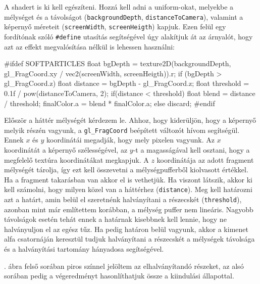 A shadert is ki kell egészíteni. Hozzá kell adni a uniform-okat, melyekbe a mélységet és a távolságot (\texttt{backgroundDepth}, \texttt{distanceToCamera}), valamint a képernyő méreteit (\texttt{screenWidth}, \texttt{screenHeigth}) kapjuk. Ezen felül egy fordítónak szóló \texttt{\#define} utasítás segítségével úgy alakítjuk át az árnyalót, hogy azt az effekt megvalósítása nélkül is lehessen használni:
\begin{cpp}
#ifdef SOFTPARTICLES
float bgDepth = texture2D(backgroundDepth, 
		    gl_FragCoord.xy / vec2(screenWidth, screenHeigth)).r;
if (bgDepth > gl_FragCoord.z){
    float distance = bgDepth - gl_FragCoord.z;
    float threshold = 0.1f / pow(distanceToCamera, 2);
    if(distance < threshold)
    {
        float blend = distance / threshold;
        finalColor.a = blend * finalColor.a;
    }
}
else{
    discard;
}
#endif
\end{cpp}
Először a háttér mélységét kérdezem le. Ahhoz, hogy kiderüljön, hogy a képernyő melyik részén vagyunk, a \texttt{gl\_FragCoord} beépített változót hívom segítségül. Ennek $x$ és $y$ koordinátái megadják, hogy mely pixelen vagyunk. Az $x$ koordinátát a képernyő szélességével, az $y$-t a magasságával kell osztani, hogy a megfelelő textúra koordinátákat megkapjuk. A $z$ koordinátája az adott fragment mélységét tárolja, így ezt kell összevetni a mélységpufferből kiolvasott értékkel. Ha a fragment takarásban van akkor el is vethetjük. Ha viszont látszik, akkor ki kell számolni, hogy milyen közel van a háttérhez (\texttt{distance}). Meg kell határozni azt a határt, amin belül el szeretnénk halványítani a részecskét (\texttt{threshold}), azonban mint már említettem korábban, a mélység puffer nem lineáris. Nagyobb távolságok esetén tehát ennek a határnak kisebbnek kell lennie, hogy ne halványuljon el az egész tűz. Ha pedig határon belül vagyunk, akkor a kimenet alfa csatornáján keresztül tudjuk halványítani a részecskét a mélységek távolsága és a halványítási tartomány hányadosa segítségével.

. ábra felső sorában piros színnel jelöltem az elhalványítandó részeket, az alsó sorában pedig a végeredményt hasonlíthatjuk össze a kiindulási állapottal.

